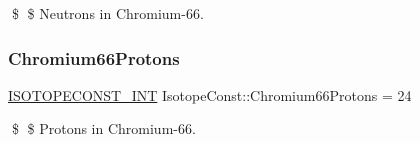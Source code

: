 \$ \$ Neutrons in Chromium-\/66. \mbox{\label{group___isotope_const-_chromium-_cr66_gafa2654f8d55a5d2c47c0ce8aa5d39896}} 
\subsubsection{\texorpdfstring{Chromium66\+Protons}{Chromium66Protons}}
{\footnotesize\ttfamily \mbox{\hyperlink{group___isotope_const-_macros_ga5f18360b3e99483a35c32d789e62621c}{I\+S\+O\+T\+O\+P\+E\+C\+O\+N\+S\+T\+\_\+\+I\+NT}} Isotope\+Const\+::\+Chromium66\+Protons = 24}

\$ \$ Protons in Chromium-\/66. 
